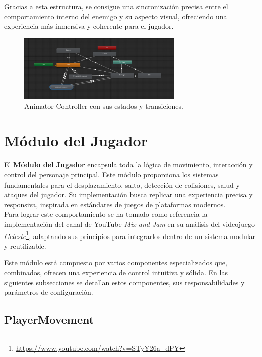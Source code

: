 Gracias a esta estructura, se consigue una sincronización precisa entre el comportamiento interno del enemigo y su aspecto visual, ofreciendo una experiencia más inmersiva y coherente para el jugador.

\begin{figure}[t]
	\centering
	\includegraphics[width = 0.7\textwidth]{Imagenes/AnimatorController.png}
	\caption{Animator Controller con sus estados y transiciones.}
	\label{fig:AnimatorController_Image}
\end{figure}

\section{Módulo del Jugador} \label{sec:player}

El \textbf{Módulo del Jugador} encapsula toda la lógica de movimiento, interacción y control del personaje principal. Este módulo proporciona los sistemas fundamentales para el desplazamiento, salto, detección de colisiones, salud y ataques del jugador. Su implementación busca replicar una experiencia precisa y responsiva, inspirada en estándares de juegos de plataformas modernos.\\

Para lograr este comportamiento se ha tomado como referencia la implementación del canal de YouTube \textit{Mix and Jam} en su análisis del videojuego \textit{Celeste}\footnote{\url{https://www.youtube.com/watch?v=STyY26a_dPY}}, adaptando sus principios para integrarlos dentro de un sistema modular y reutilizable.

Este módulo está compuesto por varios componentes especializados que, combinados, ofrecen una experiencia de control intuitiva y sólida. En las siguientes subsecciones se detallan estos componentes, sus responsabilidades y parámetros de configuración.

\subsection{PlayerMovement}

